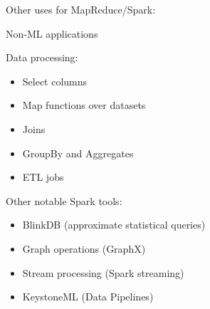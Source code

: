 Other uses for MapReduce/Spark:

Non-ML applications

Data processing:
\begin{itemize}
 \item Select columns
 \item Map functions over datasets
 \item Joins
 \item GroupBy and Aggregates
 \item ETL jobs
\end{itemize}

Other notable Spark tools:
\begin{itemize}
 \item BlinkDB (approximate statistical queries)
 \item Graph operations (GraphX)
 \item Stream processing (Spark streaming)
 \item KeystoneML (Data Pipelines)
\end{itemize}













